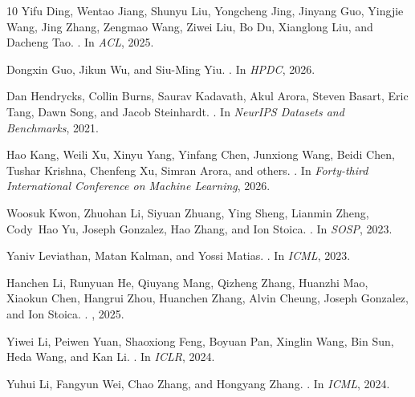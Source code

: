 \begin{thebibliography}{10}
Yifu Ding, Wentao Jiang, Shunyu Liu, Yongcheng Jing, Jinyang Guo, Yingjie
  Wang, Jing Zhang, Zengmao Wang, Ziwei Liu, Bo Du, Xianglong Liu, and
  Dacheng Tao.
.
\newblock In {\em ACL}, 2025.

Dongxin Guo, Jikun Wu, and Siu-Ming Yiu.
.
\newblock In {\em HPDC}, 2026.

Dan Hendrycks, Collin Burns, Saurav Kadavath, Akul Arora, Steven Basart, Eric
  Tang, Dawn Song, and Jacob Steinhardt.
.
\newblock In {\em NeurIPS Datasets and Benchmarks}, 2021.

Hao Kang, Weili Xu, Xinyu Yang, Yinfang Chen, Junxiong Wang, Beidi Chen,
  Tushar Krishna, Chenfeng Xu, Simran Arora, and others.
.
\newblock In {\em Forty-third International Conference on Machine Learning},
  2026.

Woosuk Kwon, Zhuohan Li, Siyuan Zhuang, Ying Sheng, Lianmin Zheng, Cody~Hao Yu,
  Joseph Gonzalez, Hao Zhang, and Ion Stoica.
.
\newblock In {\em SOSP}, 2023.

Yaniv Leviathan, Matan Kalman, and Yossi Matias.
.
\newblock In {\em ICML}, 2023.

Hanchen Li, Runyuan He, Qiuyang Mang, Qizheng Zhang, Huanzhi Mao, Xiaokun Chen,
  Hangrui Zhou, Huanchen Zhang, Alvin Cheung, Joseph Gonzalez, and Ion Stoica.
.
, 2025.

Yiwei Li, Peiwen Yuan, Shaoxiong Feng, Boyuan Pan, Xinglin Wang, Bin Sun,
  Heda Wang, and Kan Li.
.
\newblock In {\em ICLR}, 2024.

Yuhui Li, Fangyun Wei, Chao Zhang, and Hongyang Zhang.
.
\newblock In {\em ICML}, 2024.


\end{thebibliography}
